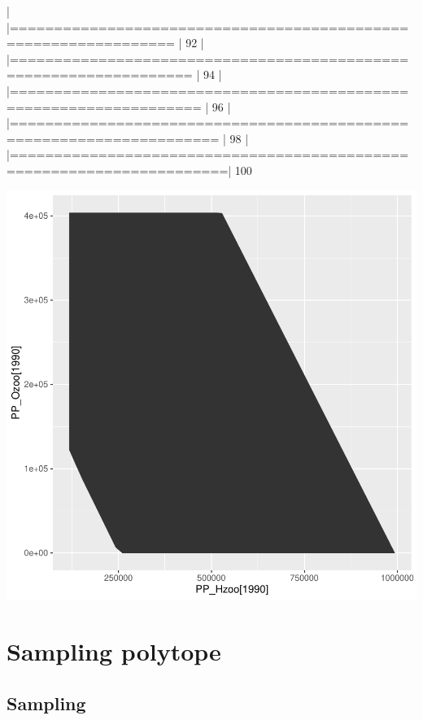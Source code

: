 \documentclass{article}
\begin{document}
\begin{Schunk}
\begin{Soutput}
  |                                                                            
  |================================================================      |  92%
  |                                                                            
  |==================================================================    |  94%
  |                                                                            
  |===================================================================   |  96%
  |                                                                            
  |===================================================================== |  98%
  |                                                                            
  |======================================================================| 100%
\end{Soutput}
\end{Schunk}
\includegraphics{barents_SM-011}

\clearpage

\section{Sampling polytope}

\subsection{Sampling}
\end{document}
